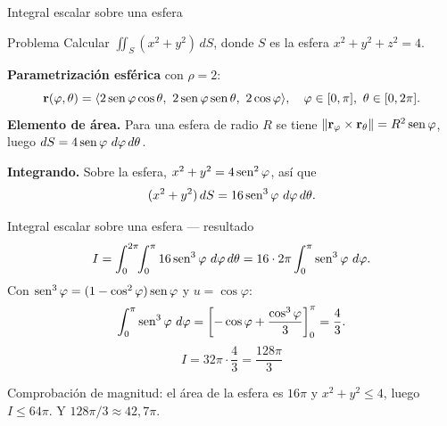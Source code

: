 \documentclass[11pt,aspectratio=169]{beamer}
\begin{document}
\begin{frame}{Integral escalar sobre una esfera}
  \begin{block}{Problema}
    Calcular $\displaystyle\iint_S (x^2+y^2)\,dS$, donde $S$ es la esfera $x^2+y^2+z^2=4$.
  \end{block}
  \pause
  \textbf{Parametrización esférica} con $\rho=2$:
  \[
    \mathbf r(\varphi,\theta)=\langle 2\operatorname{sen}\varphi\cos\theta,\ 2\operatorname{sen}\varphi\operatorname{sen}\theta,\ 2\cos\varphi\rangle,
    \quad \varphi\in[0,\pi],\ \theta\in[0,2\pi].
  \]
  \pause
  \textbf{Elemento de área.} Para una esfera de radio $R$ se tiene $\|\mathbf r_\varphi\times\mathbf r_\theta\|=R^2\operatorname{sen}\varphi$, luego $dS=4\operatorname{sen}\varphi\ d\varphi\,d\theta$.
  \pause
  \vspace{4pt}

  \textbf{Integrando.} Sobre la esfera, $x^2+y^2 = 4\operatorname{sen}^2\varphi$, así que
  \[
    (x^2+y^2)\,dS = 16\sen^3\varphi\ d\varphi\,d\theta.
  \]
\end{frame}

\begin{frame}{Integral escalar sobre una esfera --- resultado}
  \[
    I = \int_0^{2\pi}\!\!\int_0^\pi 16\sen^3\varphi\ d\varphi\,d\theta
      = 16\cdot 2\pi\int_0^\pi \sen^3\varphi\ d\varphi.
  \]
  \pause
  Con $\operatorname{sen}^3\varphi = (1-\cos^2\varphi)\operatorname{sen}\varphi$ y $u=\cos\varphi$:
  \[
    \int_0^\pi \operatorname{sen}^3\varphi\ d\varphi = \left[-\cos\varphi+\frac{\cos^3\varphi}{3}\right]_0^\pi = \frac43.
  \]
  \pause
  \[
    I = 32\pi\cdot\frac43 = \boxed{\frac{128\pi}{3}}
  \]
  \pause
  \vspace{2pt}
  \begin{center}\small\color{gray60}
  Comprobación de magnitud: el área de la esfera es $16\pi$ y $x^2+y^2\le4$, luego $I\le64\pi$. Y $128\pi/3\approx 42{,}7\pi$. \checkmark
  \end{center}
\end{frame}
\end{document}
